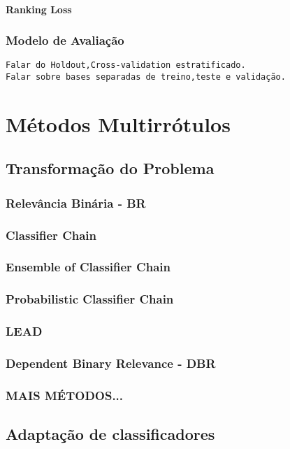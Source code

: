 \subsubsection{Ranking Loss}
\subsection{Modelo de Avaliação}
\label{sec:modelav}

\begin{verbatim}
Falar do Holdout,Cross-validation estratificado.
Falar sobre bases separadas de treino,teste e validação.
\end{verbatim}

\chapter{Métodos Multirrótulos}
\section{Transformação do Problema}
\subsection{Relevância Binária - BR}
\subsection{Classifier Chain}
\subsection{Ensemble of Classifier Chain}
\subsection{Probabilistic Classifier Chain}
\subsection{LEAD}
\subsection{Dependent Binary Relevance - DBR}
\label{sec:dbr}
\subsection{MAIS MÉTODOS...}

\section{Adaptação de classificadores}
